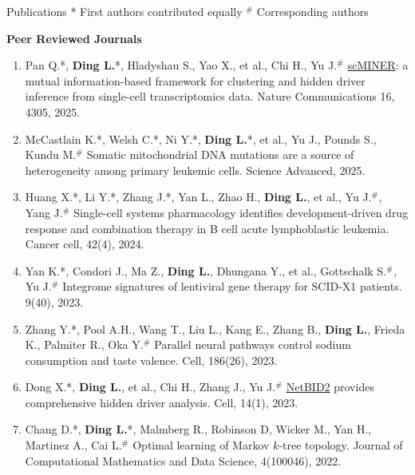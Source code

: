 \documentclass{resume} %
\begin{document}

\begin{rSection}{Publications}
* First authors contributed equally  $^{\#}$ Corresponding authors

\textbf{Peer Reviewed Journals}
\begin{enumerate}
\item Pan Q.*, \textbf{Ding L.}*, Hladyshau S., Yao X., et al., Chi H., Yu J.$^{\#}$ \href{https://github.com/jyyulab/scMINER}{scMINER}: a mutual information-based framework for clustering and hidden driver inference from single-cell transcriptomics data. Nature Communications 16, 4305, 2025.

\item McCastlain K.*, Welsh C.*, Ni Y.*, \textbf{Ding L.}*, et al., Yu J., Pounds S., Kundu M.$^{\#}$ Somatic mitochondrial DNA mutations are a source of heterogeneity among primary leukemic cells. Science Advanced, 2025.

\item Huang X.*, Li Y.*, Zhang J.*, Yan L., Zhao H., \textbf{Ding L.}, et al., Yu J.$^{\#}$, Yang J.$^{\#}$ Single-cell systems pharmacology identifies development-driven drug response and combination therapy in B cell acute lymphoblastic leukemia. Cancer cell, 42(4), 2024.

\item Yan K.*, Condori J., Ma Z., \textbf{Ding L.}, Dhungana Y., et al., Gottschalk S.$^{\#}$, Yu J.$^{\#}$ Integrome signatures of lentiviral gene therapy for SCID-X1 patients. 9(40), 2023.

\item Zhang Y.*, Pool A.H., Wang T., Liu L., Kang E., Zhang B., \textbf{Ding L.}, Frieda K., Palmiter R., Oka Y.$^{\#}$ Parallel neural pathways control sodium consumption and taste valence. Cell, 186(26), 2023.

\item Dong X.*, \textbf{Ding L.}, et al., Chi H., Zhang J., Yu J.$^{\#}$ \href{https://github.com/jyyulab/NetBID}{NetBID2} provides comprehensive hidden driver analysis. Cell, 14(1), 2023.

\item Chang D.*, \textbf{Ding L.}*, Malmberg R., Robinson D, Wicker M., Yan H., Martinez A., Cai L.$^{\#}$ Optimal learning of Markov $k$-tree topology. Journal of Computational Mathematics and Data Science, 4(100046), 2022.


\end{enumerate}
\end{rSection}
\end{document}
